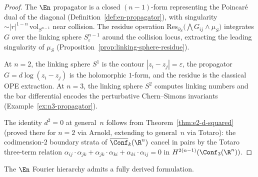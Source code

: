 \begin{proof}
The $\En$ propagator is a closed $(n{-}1)$-form representing the
Poincar\'e dual of the diagonal
(Definition~\ref{def:en-propagator}), with singularity
$\sim |r|^{1-n}\, \mathrm{vol}_{S^{n-1}}$ near collision.  The
residue operation
$\mathrm{Res}_{\partial_S}\bigl(\bigwedge G_{ij} \wedge \mu_S\bigr)$
integrates $G$ over the linking sphere
$S^{n-1}_\varepsilon$ around the collision locus, extracting the
leading singularity of $\mu_S$
(Proposition~\ref{prop:linking-sphere-residue}).

At $n = 2$, the linking sphere $S^1$ is the contour
$|z_i - z_j| = \varepsilon$, the propagator
$G = d\log(z_i - z_j)$ is the holomorphic $1$-form, and the
residue is the classical OPE extraction.  At $n = 3$, the linking
sphere $S^2$ computes linking numbers and the bar differential
encodes the perturbative Chern--Simons invariants
(Example~\ref{ex:n3-propagator}).

The identity $d^2 = 0$ at general~$n$ follows from
Theorem~\ref{thm:e2-d-squared} (proved there for $n = 2$ via
Arnold, extending to general~$n$ via Totaro): the
codimension-$2$ boundary strata of $\overline{\Conf}_k(\R^n)$
cancel in pairs by the Totaro three-term relation
$\alpha_{ij} \cdot \alpha_{jk} + \alpha_{jk} \cdot \alpha_{ki}
+ \alpha_{ki} \cdot \alpha_{ij} = 0$ in
$H^{2(n-1)}(\Conf_3(\R^n))$.
\end{proof}

The $\En$ Fourier hierarchy admits a fully derived formulation.

